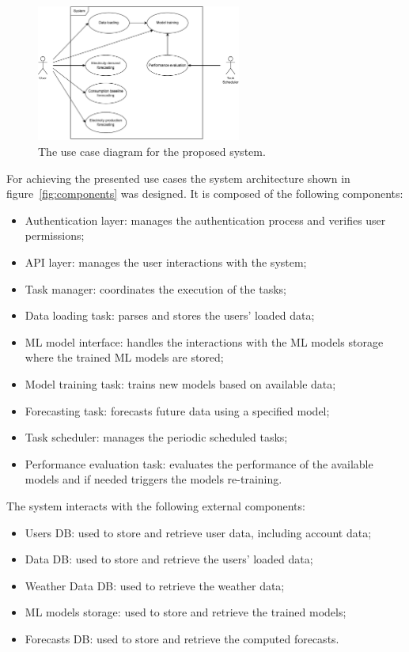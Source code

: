 \begin{figure}[H]
\centering
\includegraphics[width=0.6\textwidth]{images/architecture_use_case}
\caption{The use case diagram for the proposed system.}
\label{fig:usecase}
\end{figure}

For achieving the presented use cases the system architecture shown in figure~\ref{fig:components} was designed.
It is composed of the following components:
\begin{itemize}
  \item Authentication layer: manages the authentication process and verifies user permissions;
  \item API layer: manages the user interactions with the system;
  \item Task manager: coordinates the execution of the tasks;
  \item Data loading task: parses and stores the users' loaded data;
  \item ML model interface: handles the interactions with the ML models storage where the trained ML models are stored;
  \item Model training task: trains new models based on available data;
  \item Forecasting task: forecasts future data using a specified model;
  \item Task scheduler: manages the periodic scheduled tasks;
  \item Performance evaluation task: evaluates the performance of the available models and if needed triggers the models re-training.
\end{itemize}

The system interacts with the following external components:
\begin{itemize}
  \item Users DB: used to store and retrieve user data, including account data;
  \item Data DB: used to store and retrieve the users' loaded data;
  \item Weather Data DB: used to retrieve the weather data;
  \item ML models storage: used to store and retrieve the trained models;
  \item Forecasts DB: used to store and retrieve the computed forecasts.
\end{itemize}

